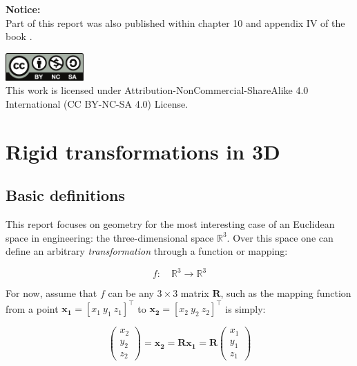 \documentclass[a4paper,11pt]{report}
\begin{document}
\vfill
\textbf{Notice:} \\

Part of this report was also published within chapter 10 and appendix IV of the
book \cite{madrigal2012slambook}.

\vspace{1cm}

\begin{scriptsize}
\begin{center}
\includegraphics[width=3cm]{imgs/by-nc-sa.pdf}
\\
This work is licensed under
Attribution-NonCommercial-ShareAlike 4.0 International (CC BY-NC-SA 4.0)
License.
\end{center}

\end{scriptsize}


\newpage

\tableofcontents


\chapter{Rigid transformations in 3D}


\section{Basic definitions}
\label{sect:basic}

This report focuses on geometry for the most interesting case of an Euclidean space in
engineering: the three-dimensional space $\mathbb{R}^3$.
Over this space one can define an arbitrary \emph{transformation} through
a function or mapping:

\begin{equation}
 f: \quad \mathbb{R}^3 \rightarrow \mathbb{R}^3
\end{equation}

For now, assume that $f$ can be any $3 \times 3$ matrix $\mathbf{R}$,
such as the mapping function
from a point $\mathbf{x_1}=[x_1 ~ y_1 ~ z_1]^\top$ to $\mathbf{x_2}=[x_2 ~ y_2 ~ z_2]^\top$ is simply:

\begin{equation}
\left(
\begin{array}{c}
 x_2 \\ y_2 \\ z_2
\end{array}
\right)
=
 \mathbf{x_2}
=
\mathbf{R} \mathbf{x_1}
=
\mathbf{R}
\left(
\begin{array}{c}
 x_1 \\ y_1 \\ z_1
\end{array}
\right)
\end{equation}
\end{document}
